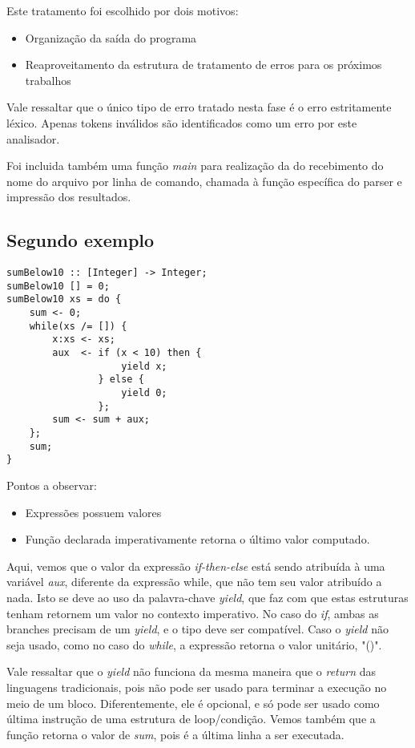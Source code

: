 \documentclass[11pt]{article}
\begin{document}
Este tratamento foi escolhido por dois motivos:

\begin{itemize}[leftmargin=.5in]
  \item Organização da saída do programa
  \item Reaproveitamento da estrutura de tratamento de erros para os próximos trabalhos
\end{itemize}

Vale ressaltar que o único tipo de erro tratado nesta fase é o erro estritamente léxico. 
Apenas tokens inválidos são identificados como um erro por este analisador.

Foi incluida também uma função \emph{main} para realização da do recebimento do nome do
arquivo por linha de comando, chamada à função específica do parser e impressão dos resultados.



\subsection{Segundo exemplo}

\begin{lstlisting}[basicstyle=\small]
sumBelow10 :: [Integer] -> Integer;
sumBelow10 [] = 0;
sumBelow10 xs = do {
    sum <- 0;
    while(xs /= []) {
        x:xs <- xs;
        aux  <- if (x < 10) then {
                    yield x;
                } else {
                    yield 0;
                };
        sum <- sum + aux;
    };
    sum;
}
\end{lstlisting}

Pontos a observar:
\begin{itemize}[leftmargin=.5in]
\item Expressões possuem valores
\item Função declarada imperativamente retorna o último valor computado.
\end{itemize}


Aqui, vemos que o valor da expressão \emph{if-then-else} está sendo atribuída à uma variável 
\emph{aux}, diferente da expressão while, que não tem seu valor atribuído a nada.
Isto se deve ao uso da palavra-chave \emph{yield}, que faz com que estas estruturas tenham retornem 
um valor no contexto imperativo. No caso do \emph{if}, ambas as branches precisam
de um \emph{yield}, e o tipo deve ser compatível.
Caso o \emph{yield} não seja usado, como no caso do \emph{while}, a expressão retorna o valor 
unitário, "()".

Vale ressaltar que o \emph{yield} não funciona da mesma maneira que o \emph{return} das linguagens 
tradicionais, pois não pode ser usado para terminar a execução no meio de um bloco.
Diferentemente, ele é opcional, e só pode ser usado como última instrução de uma estrutura de 
loop/condição.
Vemos também que a função retorna o valor de \emph{sum}, pois é a última linha a ser executada.
\end{document}
